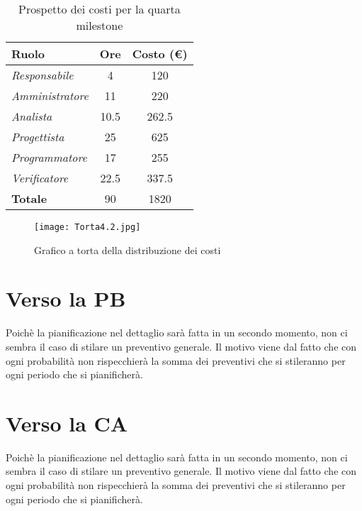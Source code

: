 \begin{table}[H]
    \centering
    \begin{tabular}{|l|c|c|}
    \hline
    \textbf{Ruolo} & \multicolumn{1}{l|}{\textbf{Ore}} & \multicolumn{1}{l|}{\textbf{Costo (€)}} \\ \hline
    \textit{Responsabile}   & 4    & 120     \\ \hline
    \textit{Amministratore} & 11   & 220     \\ \hline
    \textit{Analista}       & 10.5 & 262.5   \\ \hline
    \textit{Progettista}    & 25   & 625     \\ \hline
    \textit{Programmatore}  & 17   & 255     \\ \hline
    \textit{Verificatore}   & 22.5 & 337.5   \\ \hline
    \textbf{Totale}         & 90   & 1820    \\ \hline
    \end{tabular}
    \caption{Prospetto dei costi per la quarta milestone}
\end{table}

\begin{figure}[H]
    \texttt{[image: Torta4.2.jpg]}
    \caption{Grafico a torta della distribuzione dei costi}
\end{figure}


\section{Verso la PB}

Poichè la pianificazione nel dettaglio sarà fatta in un secondo momento, non ci sembra il caso di stilare un preventivo generale. Il motivo viene dal fatto che con ogni probabilità non rispecchierà la somma dei preventivi che si stileranno per ogni periodo che si pianificherà.

\section{Verso la CA}

Poichè la pianificazione nel dettaglio sarà fatta in un secondo momento, non ci sembra il caso di stilare un preventivo generale. Il motivo viene dal fatto che con ogni probabilità non rispecchierà la somma dei preventivi che si stileranno per ogni periodo che si pianificherà.
